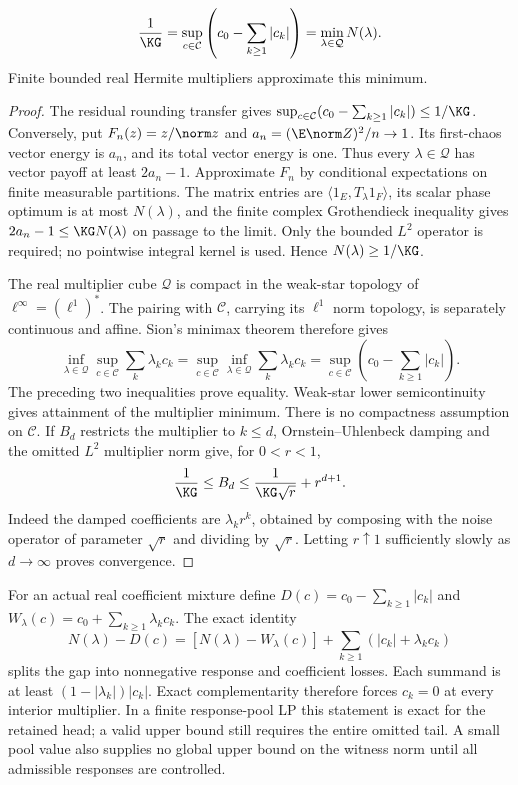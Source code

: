 \begin{theorem}
\label{thm:complex-duality}
\[
\frac1{\KG}=\sup_{c\in\mathcal C}
\left(c_0-\sum_{k\ge1}|c_k|\right)
=\min_{\lambda\in\mathcal Q}N(\lambda).
\]
Finite bounded real Hermite multipliers approximate this minimum.
\end{theorem}
\begin{proof}
The residual rounding transfer gives
$\sup_{c\in\mathcal C}(c_0-\sum_{k\ge1}|c_k|)\le1/\KG$.
Conversely, put $F_n(z)=z/\norm z$ and
$a_n=(\E\norm Z)^2/n\to1$. Its first-chaos vector energy is $a_n$,
and its total vector energy is one. Thus every $\lambda\in\mathcal Q$
has vector payoff at least $2a_n-1$. Approximate $F_n$ by conditional
expectations on finite measurable partitions. The matrix entries are
$\langle1_E,T_\lambda1_F\rangle$, its scalar phase optimum is at most
$N(\lambda)$, and the finite complex Grothendieck inequality gives
$2a_n-1\le\KG N(\lambda)$ on passage to the limit. Only the bounded
$L^2$ operator is required; no pointwise integral kernel is used.
Hence $N(\lambda)\ge1/\KG$.

The real multiplier cube $\mathcal Q$ is compact in the weak-star topology
of $\ell^\infty=(\ell^1)^*$. The pairing with $\mathcal C$, carrying its
$\ell^1$ norm topology, is separately continuous and affine.
Sion's minimax theorem therefore gives
\[
\inf_{\lambda\in\mathcal Q}\sup_{c\in\mathcal C}\sum_k\lambda_kc_k
=\sup_{c\in\mathcal C}\inf_{\lambda\in\mathcal Q}\sum_k\lambda_kc_k
=\sup_{c\in\mathcal C}\left(c_0-\sum_{k\ge1}|c_k|\right).
\]
The preceding two inequalities prove equality. Weak-star lower
semicontinuity gives attainment of the multiplier minimum. There is no
compactness assumption on $\mathcal C$. If $B_d$ restricts the multiplier
to $k\le d$, Ornstein--Uhlenbeck damping and the omitted $L^2$ multiplier
norm give, for $0<r<1$,
\[
\frac1{\KG}\le B_d\le\frac{1}{\KG\sqrt r}+r^{d+1}.
\]
Indeed the damped coefficients are $\lambda_kr^k$, obtained by composing
with the noise operator of parameter $\sqrt r$ and dividing by $\sqrt r$.
Letting $r\uparrow1$ sufficiently slowly as $d\to\infty$ proves convergence.
\end{proof}

For an actual real coefficient mixture define
$D(c)=c_0-\sum_{k\ge1}|c_k|$ and
$W_\lambda(c)=c_0+\sum_{k\ge1}\lambda_kc_k$. The exact identity
\begin{equation}\label{eq:crossbound-gap}
N(\lambda)-D(c)
=[N(\lambda)-W_\lambda(c)]
+\sum_{k\ge1}(|c_k|+\lambda_kc_k)
\end{equation}
splits the gap into nonnegative response and coefficient losses.
Each summand is at least $(1-|\lambda_k|)|c_k|$. Exact complementarity
therefore forces $c_k=0$ at every interior multiplier. In a finite
response-pool LP this statement is exact for the retained head; a valid
upper bound still requires the entire omitted tail. A small pool value
also supplies no global upper bound on the witness norm until all
admissible responses are controlled.

